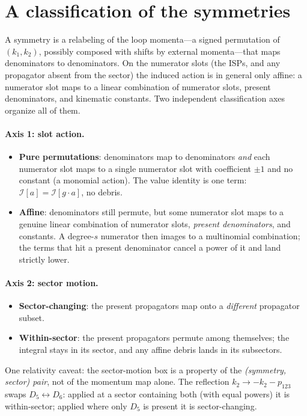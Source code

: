 \documentclass[11pt]{article}
\newcommand{\I}[1]{\mathcal{I}[#1]}
\begin{document}
\section{A classification of the symmetries}
\label{sec:classification}
A symmetry is a relabeling of the loop momenta---a signed permutation of $(k_1,k_2)$,
possibly composed with shifts by external momenta---that maps denominators to
denominators. On the numerator slots (the ISPs, and any propagator absent from the
sector) the induced action is in general only affine: a numerator slot maps to a linear
combination of numerator slots, present denominators, and kinematic constants. Two
independent classification axes organize all of them.

\paragraph{Axis 1: slot action.}
\begin{itemize}
\item \textbf{Pure permutations}: denominators map to denominators \emph{and} each
      numerator slot maps to a single numerator slot with coefficient $\pm1$ and no
      constant (a monomial action). The value identity is one term: $\I{a}=\I{g\cdot a}$,
      no debris.
\item \textbf{Affine}: denominators still permute, but some numerator slot maps to a
      genuine linear combination of numerator slots, \emph{present denominators}, and
      constants. A degree-$s$ numerator then images to a multinomial combination; the
      terms that hit a present denominator cancel a power of it and land strictly lower.
\end{itemize}

\paragraph{Axis 2: sector motion.}
\begin{itemize}
\item \textbf{Sector-changing}: the present propagators map onto a \emph{different}
      propagator subset.
\item \textbf{Within-sector}: the present propagators permute among themselves; the
      integral stays in its sector, and any affine debris lands in its subsectors.
\end{itemize}
One relativity caveat: the sector-motion box is a property of the \emph{(symmetry,
sector) pair}, not of the momentum map alone. The reflection
$k_2\to-k_2-p_{123}$ swaps $D_5\leftrightarrow D_6$: applied at a sector containing both
(with equal powers) it is within-sector; applied where only $D_5$ is present it is
sector-changing.
\end{document}
